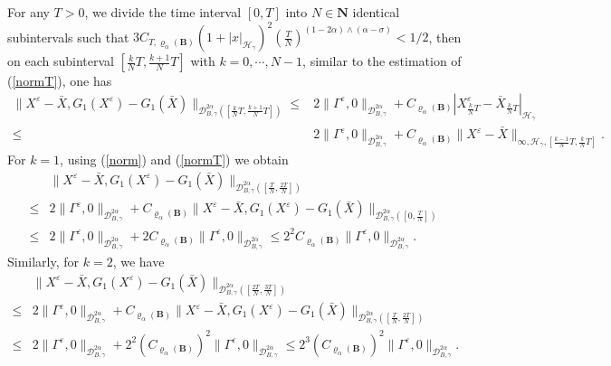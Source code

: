 \documentclass[10pt,a4paper]{article}
\numberwithin{equation}{section}
\begin{document}
For any $T>0$, we divide the time interval $[0,T]$ into $N \in \mathbf N$ identical subintervals such that $ 3 C_{T,\varrho_{\alpha}(\mathbf{B})} (1+|x|_{\mathcal H_\gamma})^2 {(\frac T N)}^{(1-2\alpha)\wedge (\alpha-\sigma)} <1/2$,
then on each subinterval $[\frac kN T,\frac {k+1}N T]$ with $k=0, \cdots , N-1$, similar to the estimation of (\ref{normT}), one has
\begin{align}\label{Xk}
\|X^\varepsilon-\bar{X}, G_1(X^\varepsilon)-G_1(\bar{X})\|_{\mathcal{D}_{B,\gamma}^{2\alpha}([\frac kN T,\frac {k+1}N T])}
\leq & 2 \|\varGamma^\varepsilon,0\|_{\mathcal{D}_{B,\gamma}^{2\alpha}}+C_{\varrho_{\alpha}(\mathbf{B})} \left|X_{\frac kN T}^\varepsilon-\bar{X}_{\frac kN T} \right|_{\mathcal H_\gamma } \nonumber\\
\leq & 2 \|\varGamma^\varepsilon,0\|_{\mathcal{D}_{B,\gamma}^{2\alpha}}+C_{\varrho_{\alpha}(\mathbf{B})} \|X^\varepsilon-\bar{X}\|_{\infty,\mathcal H_\gamma,[\frac {k-1}N T,\frac kN T]}.
\end{align}
For $k=1$, using (\ref{norm}) and (\ref{normT}) we obtain
\begin{align*}
&\|X^\varepsilon-\bar{X}, G_1(X^\varepsilon)-G_1(\bar{X})\|_{\mathcal{D}_{B,\gamma}^{2\alpha}([\frac TN,\frac {2T}N ])}\\
\leq & 2 \|\varGamma^\varepsilon,0\|_{\mathcal{D}_{B,\gamma}^{2\alpha}}+C_{\varrho_{\alpha}(\mathbf{B})}\|X^\varepsilon-\bar{X}, G_1(X^\varepsilon)-G_1(\bar{X})\|_{\mathcal{D}_{B,\gamma}^{2\alpha}([0,\frac TN ])} \\
\leq & 2 \|\varGamma^\varepsilon,0\|_{\mathcal{D}_{B,\gamma}^{2\alpha}}+2C_{\varrho_{\alpha}(\mathbf{B})}\|\varGamma^\varepsilon,0\|_{\mathcal{D}_{B,\gamma}^{2\alpha}}
\leq 2^2 C_{\varrho_{\alpha}(\mathbf{B})}\|\varGamma^\varepsilon,0\|_{\mathcal{D}_{B,\gamma}^{2\alpha}}.
\end{align*}
Similarly, for $k=2$, we have
\begin{align*}
&\|X^\varepsilon-\bar{X}, G_1(X^\varepsilon)-G_1(\bar{X})\|_{\mathcal{D}_{B,\gamma}^{2\alpha}([\frac {2T}N,\frac {3T}N ])}\\
\leq & 2 \|\varGamma^\varepsilon,0\|_{\mathcal{D}_{B,\gamma}^{2\alpha}}+C_{\varrho_{\alpha}(\mathbf{B})}\|X^\varepsilon-\bar{X}, G_1(X^\varepsilon)-G_1(\bar{X})\|_{\mathcal{D}_{B,\gamma}^{2\alpha}([\frac TN,\frac {2T}N ])} \\
\leq & 2 \|\varGamma^\varepsilon,0\|_{\mathcal{D}_{B,\gamma}^{2\alpha}}+2^2(C_{\varrho_{\alpha}(\mathbf{B})})^2\|\varGamma^\varepsilon,0\|_{\mathcal{D}_{B,\gamma}^{2\alpha}}
\leq 2^3 (C_{\varrho_{\alpha}(\mathbf{B})})^2\|\varGamma^\varepsilon,0\|_{\mathcal{D}_{B,\gamma}^{2\alpha}}.
\end{align*}
\end{document}
